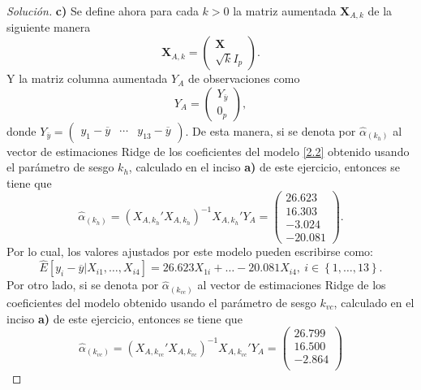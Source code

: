 \documentclass[10.5pt,notitlepage]{article}
\newenvironment{solucion}
  {\begin{proof}[Solución]}
  {\end{proof}}
\newcommand{\kis}[1]{\left\{ #1 \right\}}
\theoremstyle{plain}
\begin{document}
\begin{solucion}
\noindent \textbf{c)} Se define ahora para cada \(k > 0\) la matriz aumentada \(\mathbf{X}_{A,k}\) de la siguiente manera 
\begin{equation*}
    \mathbf{X}_{A,k}  =  \begin{pmatrix}\mathbf{X}\\ \sqrt{\mathit{k}}I_{p}\end{pmatrix}.
\end{equation*}
Y la matriz columna aumentada \(Y_A\) de observaciones como 
\begin{equation*}
    Y_A = \begin{pmatrix}Y_{\overline{y}}\\ 0_p\end{pmatrix},
\end{equation*}
donde \(Y_{\overline{y}} = \begin{pmatrix}y_{1} -\overline{y} & \cdots & y_{13} -\overline{y} \end{pmatrix}\). De esta manera, si se denota por \(\hat{\alpha}_{(k_{h})}\) al vector de estimaciones Ridge de los coeficientes del modelo \eqref{2.2} obtenido usando el parámetro de sesgo \(k_h\), calculado en el inciso \textbf{a)} de este ejercicio, entonces se tiene que
\begin{equation*}
    \hat{\alpha}_{(k_{h})} = (X_{A,k_{h}}'X_{A,k_{h}})^{-1}X_{A,k_{h}}'Y_{A} =  \begin{pmatrix} 26.623\\
 16.303\\
 -3.024\\
 -20.081\end{pmatrix}.
\end{equation*}
Por lo cual, los valores ajustados por este modelo pueden escribirse como:
\begin{equation}\label{Mod kh 1}
      \widehat{E}[y_{i} - \overline{y}| X_{i1}, \hdots, X_{i4}] = 26.623 X_{1i} + \hdots-20.081 X_{i4}, \ i \in \kis{1, \hdots, 13}.
\end{equation}
Por otro lado, si se denota por \(\hat{\alpha}_{(k_{vc})}\) al vector de estimaciones Ridge de los coeficientes del modelo obtenido usando el parámetro de sesgo \(k_{vc}\), calculado en el inciso \textbf{a)} de este ejercicio, entonces se tiene que
\begin{equation*}
 \hat{\alpha}_{(k_{vc})} = (X_{A,k_{vc}}'X_{A,k_{vc}})^{-1}X_{A,k_{vc}}'Y_{A} =  \begin{pmatrix} 26.799\\
  16.500\\
  -2.864\\

\end{pmatrix}
\end{equation*}
\end{solucion}
\end{document}
